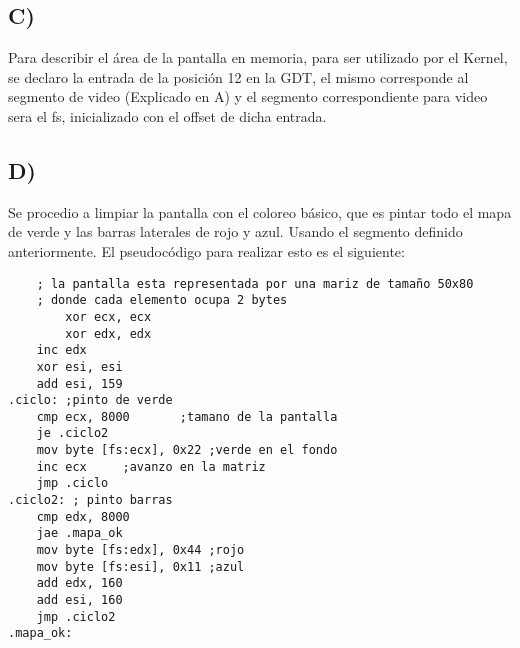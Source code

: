 \subsection*{C)}
Para describir el \'area de la pantalla en memoria, para ser utilizado por el Kernel, se declaro la entrada de la posici\'on 12 en la GDT, el mismo corresponde al segmento de 
video (Explicado en A) y el segmento correspondiente para video sera el fs, inicializado con el offset de dicha entrada.

\subsection*{D)}
Se procedio a limpiar la pantalla con el coloreo b\'asico, que es pintar todo el mapa de verde y las barras laterales de rojo y azul. Usando el segmento definido 
anteriormente. El pseudoc\'odigo para realizar esto es el siguiente: 
\begin{codesnippet}
\begin{verbatim}
    ; la pantalla esta representada por una mariz de tamaño 50x80 
    ; donde cada elemento ocupa 2 bytes
        xor ecx, ecx
        xor edx, edx 
	inc edx
	xor esi, esi
	add esi, 159
.ciclo: ;pinto de verde
	cmp ecx, 8000		;tamano de la pantalla
	je .ciclo2
	mov byte [fs:ecx], 0x22	;verde en el fondo
	inc ecx		;avanzo en la matriz
	jmp .ciclo	
.ciclo2: ; pinto barras
	cmp edx, 8000
	jae .mapa_ok
	mov byte [fs:edx], 0x44	;rojo
	mov byte [fs:esi], 0x11	;azul
	add edx, 160 
	add esi, 160
	jmp .ciclo2
.mapa_ok:

\end{verbatim}
\end{codesnippet}